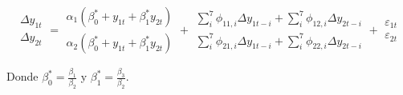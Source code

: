 \begin{equation}
\begin{array}{c} \Delta y_{1t} \\ \Delta y_{2t} \end{array} = 
\begin{array}{c} \alpha_{1}(\beta^{*}_{0}+y_{1t}+\beta^{*}_{1}y_{2t}) \\
                       \alpha_{2}(\beta^{*}_{0}+y_{1t}+\beta^{*}_{1}y_{2t})\end{array}+
\begin{array}{c} \sum_{i}^{7}\phi_{11,i}\Delta y_{1t-i}+\sum_{i}^{7}\phi_{12,i}\Delta y_{2t-i} \\
                 \sum_{i}^{7}\phi_{21,i}\Delta y_{1t-i}+\sum_{i}^{7}\phi_{22,i}\Delta y_{2t-i}\end{array}+
                 \begin{array}{c} \varepsilon_{1t} \\ \varepsilon_{2t} \end{array}
\end{equation}

Donde $\beta_{0}^{*}=\frac{\beta_{1}}{\beta_{2}}$ y $\beta_{1}^{*}=\frac{\beta_3}{\beta_{2}}$.

